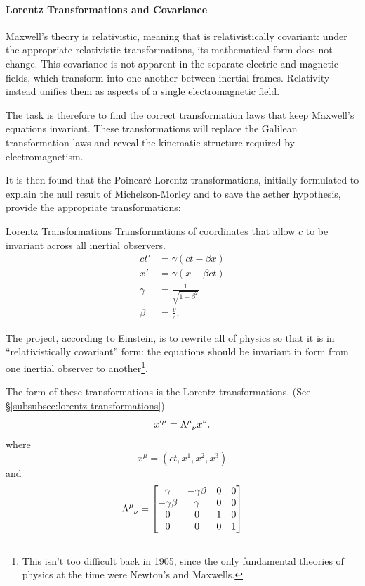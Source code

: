 	\paragraph{Lorentz Transformations and Covariance}

		Maxwell's theory is relativistic, meaning that is relativistically covariant: under the appropriate relativistic transformations, its mathematical form does not change.
		This covariance is not apparent in the separate electric and magnetic fields, which transform into one another between inertial frames. Relativity instead unifies them as aspects of a single electromagnetic field.

		The task is therefore to find the correct transformation laws that keep Maxwell's equations invariant.
		These transformations will replace the Galilean transformation laws and reveal the kinematic structure required by electromagnetism.

		It is then found that the Poincar\'e-Lorentz transformations, initially formulated to explain the null result of Michelson-Morley and to save the aether hypothesis, provide the appropriate transformations:
		\begin{theorem}{Lorentz Transformations}
			Transformations of coordinates that allow $c$ to be invariant across all inertial observers.
			\begin{align}
				ct' &= \gamma(ct-\beta x) \\
				x'  &= \gamma(x - \beta ct) \\
				\gamma &= \frac{1}{\sqrt{1-\beta^2}} \\
				\beta &= \frac{v}{c}.
			\end{align}
		\end{theorem}

		The project, according to Einstein, is to rewrite all of physics so that it is in ``relativistically covariant'' form: the equations 
		should be invariant in form from one inertial observer to another\footnote{This isn't too difficult back in 1905, since the only fundamental theories of physics at the time were Newton's and Maxwells.}.

		The form of these transformations is the Lorentz transformations. (See \S\ref{subsubsec:lorentz-transformations})
		\begin{equation}
			x'^{\mu} = \tensor{\Lambda}{^\mu_\nu} x^\nu.
		\end{equation}
		where
		\begin{equation}
			x^\mu = (ct, x^1, x^2, x^3)
		\end{equation}
		and
		\begin{equation}
			\tensor{\Lambda}{^\mu_\nu} =
			\bmqty{
				\gamma & -\gamma \beta & 0 & 0\\
				-\gamma \beta & \gamma & 0 & 0 \\
				0 & 0 & 1 & 0 \\
				0 & 0 & 0 & 1
			}
		\end{equation}


